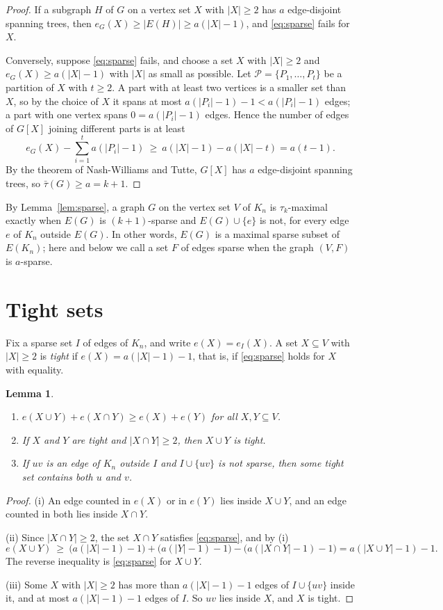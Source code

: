 \documentclass[11pt]{amsart}
\newtheorem{lemma}[theorem]{Lemma}
\theoremstyle{definition}
\theoremstyle{remark}
\numberwithin{equation}{section}
\newcommand{\tb}{\bar\tau}
\begin{document}
\begin{proof}
If a subgraph $H$ of $G$ on a vertex set $X$ with $|X|\ge2$ has $a$ edge-disjoint spanning trees, then $e_G(X)\ge|E(H)|\ge a(|X|-1)$, and \eqref{eq:sparse} fails for $X$.

Conversely, suppose \eqref{eq:sparse} fails, and choose a set $X$ with $|X|\ge2$ and $e_G(X)\ge a(|X|-1)$ with $|X|$ as small as possible. Let $\mathcal P=\{P_1,\dots,P_t\}$ be a partition of $X$ with $t\ge2$. A part with at least two vertices is a smaller set than $X$, so by the choice of $X$ it spans at most $a(|P_i|-1)-1<a(|P_i|-1)$ edges; a part with one vertex spans $0=a(|P_i|-1)$ edges. Hence the number of edges of $G[X]$ joining different parts is at least
\[
e_G(X)-\sum_{i=1}^t a(|P_i|-1)\ \ge\ a(|X|-1)-a(|X|-t)=a(t-1).
\]
By the theorem of Nash-Williams and Tutte, $G[X]$ has $a$ edge-disjoint spanning trees, so $\tb(G)\ge a=k+1$.
\end{proof}

By Lemma~\ref{lem:sparse}, a graph $G$ on the vertex set $V$ of $K_n$ is $\tau_k$-maximal exactly when $E(G)$ is $(k+1)$-sparse and $E(G)\cup\{e\}$ is not, for every edge $e$ of $K_n$ outside $E(G)$. In other words, $E(G)$ is a maximal sparse subset of $E(K_n)$; here and below we call a set $F$ of edges sparse when the graph $(V,F)$ is $a$-sparse.

\section{Tight sets}\label{sec:tight}

Fix a sparse set $I$ of edges of $K_n$, and write $e(X)=e_I(X)$. A set $X\subseteq V$ with $|X|\ge2$ is \emph{tight} if $e(X)=a(|X|-1)-1$, that is, if \eqref{eq:sparse} holds for $X$ with equality.

\begin{lemma}\label{lem:tight}
\begin{enumerate}
\item[(i)] $e(X\cup Y)+e(X\cap Y)\ge e(X)+e(Y)$ for all $X,Y\subseteq V$.
\item[(ii)] If $X$ and $Y$ are tight and $|X\cap Y|\ge2$, then $X\cup Y$ is tight.
\item[(iii)] If $uv$ is an edge of $K_n$ outside $I$ and $I\cup\{uv\}$ is not sparse, then some tight set contains both $u$ and $v$.
\end{enumerate}
\end{lemma}

\begin{proof}
(i) An edge counted in $e(X)$ or in $e(Y)$ lies inside $X\cup Y$, and an edge counted in both lies inside $X\cap Y$.

(ii) Since $|X\cap Y|\ge2$, the set $X\cap Y$ satisfies \eqref{eq:sparse}, and by (i)
\[
e(X\cup Y)\ \ge\ \bigl(a(|X|-1)-1\bigr)+\bigl(a(|Y|-1)-1\bigr)-\bigl(a(|X\cap Y|-1)-1\bigr)=a(|X\cup Y|-1)-1 .
\]
The reverse inequality is \eqref{eq:sparse} for $X\cup Y$.

(iii) Some $X$ with $|X|\ge2$ has more than $a(|X|-1)-1$ edges of $I\cup\{uv\}$ inside it, and at most $a(|X|-1)-1$ edges of $I$. So $uv$ lies inside $X$, and $X$ is tight.
\end{proof}
\end{document}
